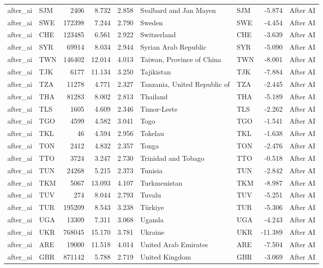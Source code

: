 \begin{tabular}{llrrrllrl}
after\_ai & SJM & 2406 & 8.732 & 2.858 & Svalbard and Jan Mayen & SJM & -5.874 & After AI \\
after\_ai & SWE & 172398 & 7.244 & 2.790 & Sweden & SWE & -4.454 & After AI \\
after\_ai & CHE & 123485 & 6.561 & 2.922 & Switzerland & CHE & -3.639 & After AI \\
after\_ai & SYR & 69914 & 8.034 & 2.944 & Syrian Arab Republic & SYR & -5.090 & After AI \\
after\_ai & TWN & 146402 & 12.014 & 4.013 & Taiwan, Province of China & TWN & -8.001 & After AI \\
after\_ai & TJK & 6177 & 11.134 & 3.250 & Tajikistan & TJK & -7.884 & After AI \\
after\_ai & TZA & 11278 & 4.771 & 2.327 & Tanzania, United Republic of & TZA & -2.445 & After AI \\
after\_ai & THA & 81283 & 8.002 & 2.813 & Thailand & THA & -5.189 & After AI \\
after\_ai & TLS & 1605 & 4.609 & 2.346 & Timor-Leste & TLS & -2.262 & After AI \\
after\_ai & TGO & 4599 & 4.582 & 3.041 & Togo & TGO & -1.541 & After AI \\
after\_ai & TKL & 46 & 4.594 & 2.956 & Tokelau & TKL & -1.638 & After AI \\
after\_ai & TON & 2412 & 4.832 & 2.357 & Tonga & TON & -2.476 & After AI \\
after\_ai & TTO & 3724 & 3.247 & 2.730 & Trinidad and Tobago & TTO & -0.518 & After AI \\
after\_ai & TUN & 24268 & 5.215 & 2.373 & Tunisia & TUN & -2.842 & After AI \\
after\_ai & TKM & 5067 & 13.093 & 4.107 & Turkmenistan & TKM & -8.987 & After AI \\
after\_ai & TUV & 274 & 8.044 & 2.793 & Tuvalu & TUV & -5.251 & After AI \\
after\_ai & TUR & 195209 & 8.543 & 3.238 & Türkiye & TUR & -5.306 & After AI \\
after\_ai & UGA & 13309 & 7.311 & 3.068 & Uganda & UGA & -4.243 & After AI \\
after\_ai & UKR & 768045 & 15.170 & 3.781 & Ukraine & UKR & -11.389 & After AI \\
after\_ai & ARE & 19000 & 11.518 & 4.014 & United Arab Emirates & ARE & -7.504 & After AI \\
after\_ai & GBR & 871142 & 5.788 & 2.719 & United Kingdom & GBR & -3.069 & After AI \\

\end{tabular}
